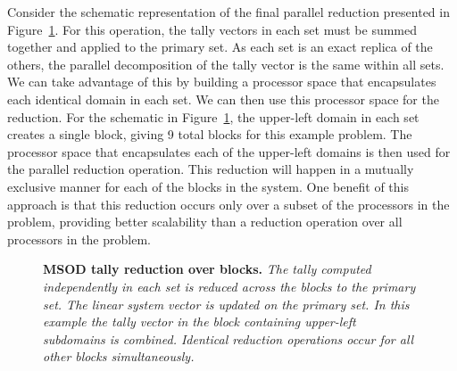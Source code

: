 Consider the schematic representation of the final parallel reduction
presented in Figure~\ref{fig:msod_tally_reduction}. For this
operation, the tally vectors in each set must be summed together and
applied to the primary set. As each set is an exact replica of the
others, the parallel decomposition of the tally vector is the same
within all sets. We can take advantage of this by building a processor
space that encapsulates each identical domain in each set. We can then
use this processor space for the reduction. For the schematic in
Figure~\ref{fig:msod_tally_reduction}, the upper-left domain in each
set creates a single block, giving 9 total blocks for this example
problem. The processor space that encapsulates each of the upper-left
domains is then used for the parallel reduction operation. This
reduction will happen in a mutually exclusive manner for each of the
blocks in the system. One benefit of this approach is that this
reduction occurs only over a subset of the processors in the problem,
providing better scalability than a reduction operation over all
processors in the problem.

\begin{figure}[t!]
  \begin{center}
    \scalebox{0.6}{  }
  \end{center}
  \caption{\textbf{MSOD tally reduction over blocks.} \textit{The
      tally computed independently in each set is reduced across the
      blocks to the primary set. The linear system vector is updated
      on the primary set. In this example the tally vector in the
      block containing upper-left subdomains is combined. Identical
      reduction operations occur for all other blocks
      simultaneously.}}
  \label{fig:msod_tally_reduction}
\end{figure}

\clearpage

